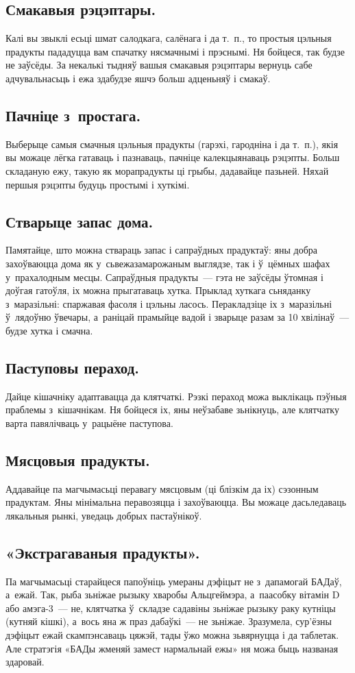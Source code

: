 \subsection{Смакавыя рэцэптары.}
Калі вы звыклі есьці шмат салодкага, салёнага і да т.~п., то простыя цэльныя прадукты пададуцца вам спачатку нясмачнымі і прэснымі. Ня бойцеся, так будзе не заўсёды. За некалькі тыдняў вашыя смакавыя рэцэптары вернуць сабе адчувальнасьць і ежа здабудзе яшчэ больш адценьняў і смакаў.

\subsection{Пачніце з~простага.}
Выберыце самыя смачныя цэльныя прадукты (гарэхі, гародніна і да т.~п.), якія вы можаце лёгка гатаваць і пазнаваць, пачніце калекцыянаваць рэцэпты. Больш складаную ежу, такую як морапрадукты ці грыбы, дадавайце пазьней. Няхай першыя рэцэпты будуць простымі і хуткімі.

\subsection{Стварыце запас дома.}
Памятайце, што можна ствараць запас і сапраўдных прадуктаў: яны добра захоўваюцца дома як у~сьвежазамарожаным выглядзе, так і ў~цёмных шафах у~прахалодным месцы. Сапраўдныя прадукты~--- гэта не заўсёды ўтомная і доўгая гатоўля, іх можна прыгатаваць хутка. Прыклад хуткага сьняданку з~маразільні: спаржавая фасоля і цэльны ласось. Перакладзіце іх з~маразільні ў~лядоўню ўвечары, а~раніцай прамыйце вадой і зварыце разам за 10 хвілінаў~--- будзе хутка і смачна.

\subsection{Паступовы пераход.}
Дайце кішачніку адаптавацца да клятчаткі. Рэзкі пераход можа выклікаць пэўныя праблемы з~кішачнікам. Ня бойцеся іх, яны неўзабаве зьнікнуць, але клятчатку варта павялічваць у~рацыёне паступова.

\subsection{Мясцовыя прадукты.}
Аддавайце па магчымасьці перавагу мясцовым (ці блізкім да іх) сэзонным прадуктам. Яны мінімальна перавозяцца і захоўваюцца. Вы можаце дасьледаваць лякальныя рынкі, уведаць добрых пастаўнікоў.

\subsection{«Экстрагаваныя прадукты».}
Па магчымасьці старайцеся папоўніць умераны дэфіцыт не з~дапамогай БАДаў, а~ежай. Так, рыба зьніжае рызыку хваробы Альцгеймэра, а~паасобку вітамін D або амэга-3~--- не, клятчатка ў~складзе садавіны зьніжае рызыку раку кутніцы (кутняй кішкі), а~вось яна ж праз дабаўкі~--- не зьніжае. Зразумела, сур'ёзны дэфіцыт ежай скампэнсаваць цяжэй, тады ўжо можна зьвярнуцца і да таблетак. Але стратэгія «БАДы жменяй замест нармальнай ежы» ня можа быць названая здаровай.

